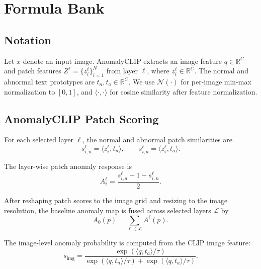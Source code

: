 
\section{Formula Bank}
\label{sec:formula_bank}

\subsection{Notation}
\label{subsec:formula_notation}

Let $x$ denote an input image. AnomalyCLIP extracts an image feature
$q \in \mathbb{R}^{C}$ and patch features
$Z^{\ell}=\{z_i^{\ell}\}_{i=1}^{N}$ from layer $\ell$, where
$z_i^{\ell}\in\mathbb{R}^{C}$. The normal and abnormal text prototypes are
$t_n,t_a\in\mathbb{R}^{C}$. We use $\mathcal{N}(\cdot)$ for per-image
min-max normalization to $[0,1]$, and $\langle \cdot,\cdot\rangle$ for cosine
similarity after feature normalization.

\subsection{AnomalyCLIP Patch Scoring}
\label{subsec:formula_clip_scoring}

For each selected layer $\ell$, the normal and abnormal patch similarities are
\begin{equation}
  s_{i,n}^{\ell} = \langle z_i^{\ell}, t_n \rangle,
  \qquad
  s_{i,a}^{\ell} = \langle z_i^{\ell}, t_a \rangle .
\end{equation}

The layer-wise patch anomaly response is
\begin{equation}
  A_i^{\ell}
  =
  \frac{s_{i,a}^{\ell} + 1 - s_{i,n}^{\ell}}{2}.
\end{equation}

After reshaping patch scores to the image grid and resizing to the image
resolution, the baseline anomaly map is fused across selected layers
$\mathcal{L}$ by
\begin{equation}
  A_0(p) = \sum_{\ell\in\mathcal{L}} A^{\ell}(p).
\end{equation}

The image-level anomaly probability is computed from the CLIP image feature:
\begin{equation}
  s_{\mathrm{img}}
  =
  \frac{\exp(\langle q,t_a\rangle/\tau)}
       {\exp(\langle q,t_n\rangle/\tau)+\exp(\langle q,t_a\rangle/\tau)} .
\end{equation}


